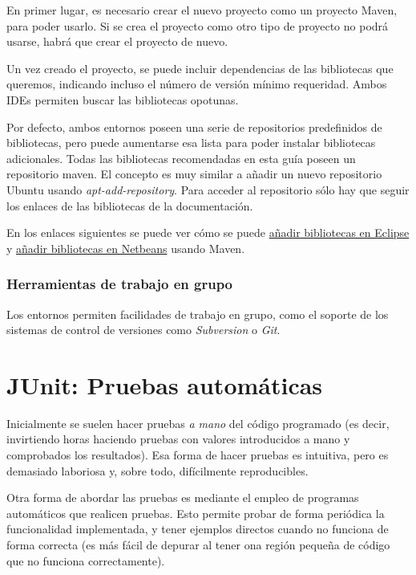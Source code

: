 \documentclass[11pt]{article}
\begin{document}
En primer lugar, es necesario crear el nuevo proyecto como un proyecto Maven,
para poder usarlo. Si se crea el proyecto como otro tipo de proyecto no podrá
usarse, habrá que crear el proyecto de nuevo.

Un vez creado el proyecto, se puede incluir dependencias de las bibliotecas que
queremos, indicando incluso el número de versión mínimo requeridad. Ambos IDEs
permiten buscar las bibliotecas opotunas.

Por defecto, ambos entornos poseen una serie de repositorios predefinidos de
bibliotecas, pero puede aumentarse esa lista para poder instalar bibliotecas
adicionales. Todas las bibliotecas recomendadas en esta guía poseen un
repositorio maven. El concepto es muy similar a añadir un nuevo repositorio
Ubuntu usando \emph{apt-add-repository}. Para acceder al repositorio sólo hay que seguir los
enlaces de las bibliotecas de la documentación.


En los enlaces siguientes se puede ver cómo se puede \href{http://m2eclipse.sonatype.org/adding-project-dependencies-in-m2eclipse.html}{añadir bibliotecas en Eclipse} y \href{http://wiki.netbeans.org/MavenBestPractices}{añadir bibliotecas en Netbeans} usando Maven.


\subsubsection{Herramientas de trabajo en grupo}
\label{sec-3-2-6}

Los entornos permiten facilidades de trabajo en grupo, como el soporte de los
sistemas de control de versiones como \emph{Subversion} o \emph{Git}.


\section{JUnit: Pruebas automáticas} \label{sec-4}

Inicialmente se suelen hacer pruebas
\emph{a mano} del código programado (es decir, invirtiendo horas haciendo pruebas con valores
introducidos a mano y comprobados los resultados). Esa forma de hacer pruebas es
intuitiva, pero es demasiado laboriosa y, sobre todo, difícilmente reproducibles. 

Otra forma de abordar las pruebas es mediante el empleo de programas automáticos
que realicen pruebas. Esto permite probar de forma periódica la funcionalidad
implementada, y tener ejemplos directos cuando no funciona de forma correcta (es
más fácil de depurar al tener ona región pequeña de código que no funciona
correctamente).
\end{document}
